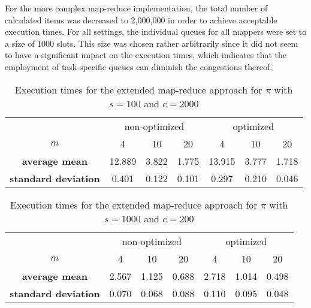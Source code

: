 For the more complex map-reduce implementation, the total number of calculated items was decreased to 2,000,000 in order to achieve acceptable execution times. For all settings, the individual queues for all mappers were set to a size of 1000 slots. This size was chosen rather arbitrarily since it did not seem to have a significant impact on the execution times, which indicates that the employment of task-specific queues can diminish the congestions thereof.
\begin{table}[h!]
\begin{center}
\begin{tabular}{c |c|c|c||c|c|c|}
  \multicolumn{1}{c}{} & \multicolumn{3}{c}{non-optimized} & \multicolumn{3}{c}{optimized}\\ \cline{2-7}
  $m$ & 4 & 10 & 20 & 4 & 10 & 20\\ \cline{2-7}
  \textbf{average mean} & 12.889 & 3.822 & 1.775 & 13.915 & 3.777 & 1.718	\\ \cline{2-7}
  \textbf{standard deviation} & 0.401 & 0.122 & 0.101 & 0.297 & 0.210 & 0.046\\ \cline{2-7}
\end{tabular}
\caption{Execution times for the extended map-reduce approach for $\pi$ with $s = 100$ and $c = 2000$}
\label{table:extended_pi_100}
\end{center}
\end{table}

\begin{table}[h!]
\begin{center}
\begin{tabular}{c |c|c|c||c|c|c|}
  \multicolumn{1}{c}{} & \multicolumn{3}{c}{non-optimized} & \multicolumn{3}{c}{optimized}\\ \cline{2-7}
  $m$ & 4 & 10 & 20 & 4 & 10 & 20\\ \cline{2-7}
  \textbf{average mean} & 2.567 & 1.125 & 0.688 & 2.718 & 1.014 & 0.498	\\ \cline{2-7}
  \textbf{standard deviation} & 0.070 & 0.068 & 0.088 & 0.110 & 0.095 & 0.048\\ \cline{2-7}
\end{tabular}
\caption{Execution times for the extended map-reduce approach for $\pi$ with $s = 1000$ and $c = 200$}
\label{table:extended_pi_1000}
\end{center}
\end{table}

